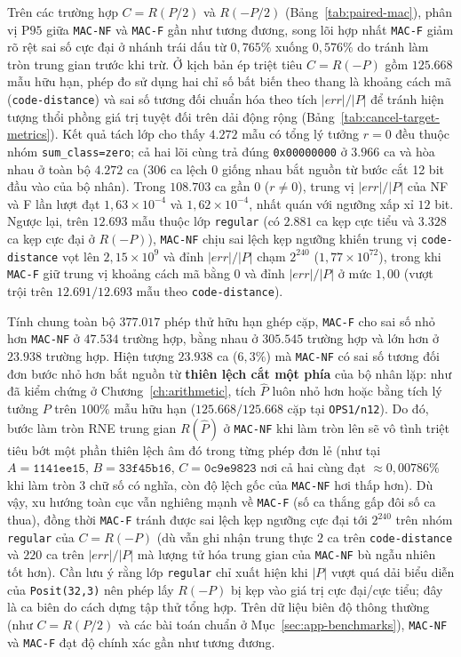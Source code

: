 Trên các trường hợp $C = R(P/2)$ và $R(-P/2)$ (Bảng~\ref{tab:paired-mac}), phân vị
$\mathrm{P95}$ giữa \texttt{MAC-NF} và \texttt{MAC-F} gần như tương đương, song
lõi hợp nhất \texttt{MAC-F} giảm rõ rệt sai số cực đại ở nhánh trái dấu từ $0{,}765\%$
xuống $0{,}576\%$ do tránh làm tròn trung gian trước khi trừ. Ở kịch bản ép triệt tiêu
$C = R(-P)$ gồm $125.668$ mẫu hữu hạn, phép đo sử dụng hai chỉ số bất biến theo
thang là khoảng cách mã (\texttt{code-distance}) và sai số tương đối chuẩn hóa theo
tích $|err|/|P|$ để tránh hiện tượng thổi phồng giá trị tuyệt đối trên dải động rộng
(Bảng~\ref{tab:cancel-target-metrics}). Kết quả tách lớp cho thấy $4.272$ mẫu có tổng
lý tưởng $r = 0$ đều thuộc nhóm \texttt{sum\_class=zero}; cả hai lõi cùng trả đúng
\texttt{0x00000000} ở $3.966$ ca và hòa nhau ở toàn bộ $4.272$ ca ($306$ ca lệch
$0$ giống nhau bắt nguồn từ bước cắt 12 bit đầu vào của bộ nhân). Trong $108.703$
ca gần $0$ ($r \ne 0$), trung vị $|err|/|P|$ của NF và F lần lượt đạt $1{,}63{\times}10^{-4}$
và $1{,}62{\times}10^{-4}$, nhất quán với ngưỡng xấp xỉ $12$ bit. Ngược lại, trên
$12.693$ mẫu thuộc lớp \texttt{regular} (có $2.881$ ca kẹp cực tiểu và $3.328$ ca
kẹp cực đại ở $R(-P)$), \texttt{MAC-NF} chịu sai lệch kẹp ngưỡng khiến trung vị
\texttt{code-distance} vọt lên $2{,}15{\times}10^9$ và đỉnh $|err|/|P|$ chạm $2^{240}$
($1{,}77{\times}10^{72}$), trong khi \texttt{MAC-F} giữ trung vị khoảng cách mã bằng
$0$ và đỉnh $|err|/|P|$ ở mức $1{,}00$ (vượt trội trên $12.691/12.693$ mẫu theo
\texttt{code-distance}).



Tính chung toàn bộ $377.017$ phép thử hữu hạn ghép cặp, \texttt{MAC-F} cho sai số
nhỏ hơn \texttt{MAC-NF} ở $47.534$ trường hợp, bằng nhau ở $305.545$ trường hợp và
lớn hơn ở $23.938$ trường hợp. Hiện tượng $23.938$ ca ($6{,}3\%$) mà \texttt{MAC-NF}
có sai số tương đối đơn bước nhỏ hơn bắt nguồn từ \textbf{thiên lệch cắt một phía}
của bộ nhân lặp: như đã kiểm chứng ở Chương~\ref{ch:arithmetic}, tích $\widehat{P}$
luôn nhỏ hơn hoặc bằng tích lý tưởng $P$ trên $100\%$ mẫu hữu hạn ($125.668/125.668$
cặp tại \texttt{OPS1/n12}). Do đó, bước làm tròn RNE trung gian $R(\widehat{P})$ ở
\texttt{MAC-NF} khi làm tròn lên sẽ vô tình triệt tiêu bớt một phần thiên lệch âm
đó trong từng phép đơn lẻ (như tại $A=\texttt{1141ee15}$, $B=\texttt{33f45b16}$,
$C=\texttt{0c9e9823}$ nơi cả hai cùng đạt $\approx 0{,}00786\%$ khi làm tròn 3 chữ số
có nghĩa, còn độ lệch gốc của \texttt{MAC-NF} hơi thấp hơn). Dù vậy, xu hướng toàn cục
vẫn nghiêng mạnh về \texttt{MAC-F} (số ca thắng gấp đôi số ca thua), đồng thời
\texttt{MAC-F} tránh được sai lệch kẹp ngưỡng cực đại tới $2^{240}$ trên nhóm
\texttt{regular} của $C=R(-P)$ (dù vẫn ghi nhận trung thực $2$ ca trên \texttt{code-distance}
và $220$ ca trên $|err|/|P|$ mà lượng tử hóa trung gian của \texttt{MAC-NF} bù ngẫu
nhiên tốt hơn). Cần lưu ý rằng lớp \texttt{regular} chỉ xuất hiện khi $|P|$ vượt
quá dải biểu diễn của \texttt{Posit(32,3)} nên phép lấy $R(-P)$ bị kẹp vào giá
trị cực đại/cực tiểu; đây là ca biên do cách dựng tập thử tổng hợp. Trên dữ liệu
biên độ thông thường (như $C=R(P/2)$ và các bài toán chuẩn ở Mục~\ref{sec:app-benchmarks}),
\texttt{MAC-NF} và \texttt{MAC-F} đạt độ chính xác gần như tương đương.

